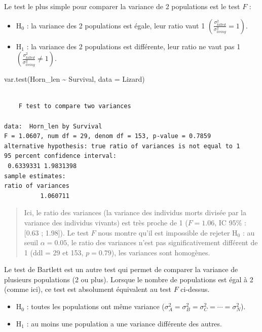 \documentclass[
  french,
  a4paper,
  DIV=11,
  numbers=noendperiod,
  oneside]{scrreprt}
\newenvironment{Shaded}{}{}
\newcommand{\AttributeTok}[1]{\textcolor[rgb]{0.84,0.23,0.29}{#1}}
\newcommand{\FunctionTok}[1]{\textcolor[rgb]{0.44,0.26,0.76}{#1}}
\newcommand{\NormalTok}[1]{\textcolor[rgb]{0.14,0.16,0.18}{#1}}
\newcommand{\SpecialCharTok}[1]{\textcolor[rgb]{0.00,0.36,0.77}{#1}}
\providecommand{\tightlist}{%
  \setlength{\itemsep}{0pt}\setlength{\parskip}{0pt}}
\begin{document}
Le test le plus simple pour comparer la variance de 2 populations est le
test \(F\) :

\begin{itemize}
\tightlist
\item
  H\(_0\) : la variance des 2 populations est égale, leur ratio vaut 1
  \(\left(\frac{\sigma^2_{killed}}{\sigma^2_{living}} = 1\right)\).
\item
  H\(_1\) : la variance des 2 populations est différente, leur ratio ne
  vaut pas 1
  \(\left(\frac{\sigma^2_{killed}}{\sigma^2_{living}} \neq 1\right)\).
\end{itemize}

\begin{Shaded}
\begin{Highlighting}[]
\FunctionTok{var.test}\NormalTok{(Horn\_len }\SpecialCharTok{\textasciitilde{}}\NormalTok{ Survival, }\AttributeTok{data =}\NormalTok{ Lizard)}
\end{Highlighting}
\end{Shaded}

\begin{verbatim}

    F test to compare two variances

data:  Horn_len by Survival
F = 1.0607, num df = 29, denom df = 153, p-value = 0.7859
alternative hypothesis: true ratio of variances is not equal to 1
95 percent confidence interval:
 0.6339331 1.9831398
sample estimates:
ratio of variances 
          1.060711 
\end{verbatim}

\begin{quote}
Ici, le ratio des variances (la variance des individus morts divisée par
la variance des individus vivants) est très proche de 1 (\(F = 1.06\),
IC 95\% : {[}0.63 ; 1.98{]}). Le test \(F\) nous montre qu'il est
impossible de rejeter H\(_0\) : au seuil \(\alpha = 0.05\), le ratio des
variances n'est pas significativement différent de 1 (ddl = 29 et 153,
\(p = 0.79\)), les variances sont homogènes.
\end{quote}

Le test de Bartlett est un autre test qui permet de comparer la variance
de plusieurs populations (2 ou plus). Lorsque le nombre de populations
est égal à 2 (comme ici), ce test est absolument équivalent au test
\(F\) ci-dessus.

\begin{itemize}
\tightlist
\item
  H\(_0\) : toutes les populations ont même variance
  (\(\sigma^2_A = \sigma^2_B = \sigma^2_C = \cdots = \sigma^2_N\)).
\item
  H\(_1\) : au moins une population a une variance différente des
  autres.
\end{itemize}
\end{document}
